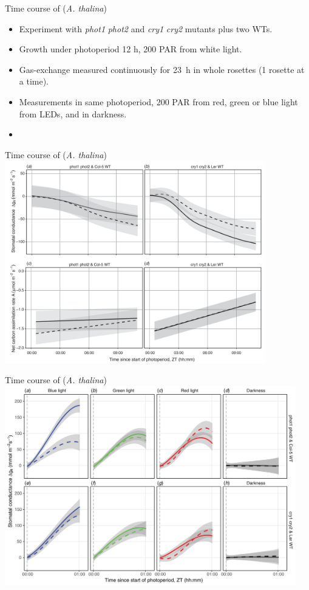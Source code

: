 \documentclass[10pt]{beamer}\usepackage[]{graphicx}\usepackage[]{color}
\begin{document}
\begin{frame}{Time course of \gs (\emph{A. thalina})}
\begin{itemize}
  \item Experiment with \emph{phot1} \emph{phot2} and \emph{cry1} \emph{cry2} mutants plus two WTs.
  \item Growth under photoperiod 12 h, 200 \umol PAR from white light.
  \item Gas-exchange measured continuously for 23~h in whole rosettes (1 rosette at a time).
  \item Measurements in same photoperiod, 200 \umol PAR from red, green or blue light from LEDs, and in darkness.
  \item \autocite[See][for details]{Wang2020}
\end{itemize}
\end{frame}

\begin{frame}{Time course of \gs (\emph{A. thalina})}
 \centering
    \includegraphics[width=0.85\textwidth]{figures/Wang-A-gs-time-course-dark}
\end{frame}

\begin{frame}{Time course of \gs (\emph{A. thalina})}
 \centering
    \includegraphics[width=0.95\textwidth]{figures/Wang-gs-1st-hour-light-dark}
\end{frame}
\end{document}
